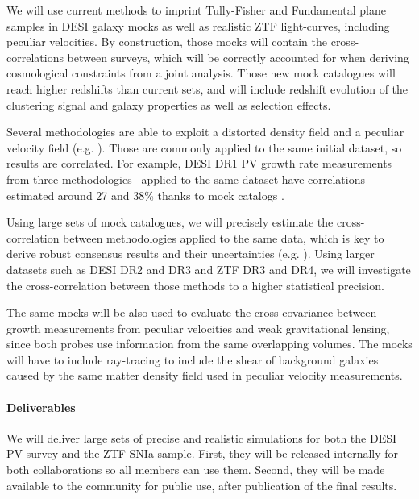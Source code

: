     We will use current methods to imprint Tully-Fisher and Fundamental plane samples in 
    DESI galaxy mocks as well as realistic ZTF light-curves, including peculiar velocities. 
    By construction, those mocks will contain the cross-correlations between surveys, 
    which will be correctly accounted for when deriving cosmological constraints from a 
    joint analysis.     
    Those new mock catalogues will reach higher redshifts than current sets, 
    and will include redshift evolution of the clustering signal and galaxy properties as well as 
    selection effects. 


    Several methodologies are able to exploit a distorted 
    density field and a peculiar velocity field 
    (e.g.  
    \cite{ravouxGeneralizedFrameworkLikelihoodbased2025,
    qinRedshiftspaceMomentumPower2025}). 
    Those are commonly applied to the same initial dataset, 
    so results are correlated. For example, DESI DR1 PV growth rate measurements from three methodologies\
    \cite{qinDESIDR1Peculiar2025,laiDESIDR1Peculiar2025,turnerDESIDR1Peculiar2025} 
    applied to the same dataset have correlations estimated around 27 and 38\% 
    thanks to mock catalogs \cite{bautistaDESIDR1Peculiar2025}.

    Using large sets of mock catalogues, we will 
    precisely estimate the cross-correlation between methodologies applied to the same data, 
    which is key to derive robust consensus results and their uncertainties
    (e.g. \cite{sanchezClusteringGalaxiesCompleted2017,
    bautistaCompletedSDSSIVExtended2021,
    dumerchatBaryonAcousticOscillations2022}).
    Using larger datasets such as DESI DR2 and DR3 and ZTF DR3 and DR4, we will 
    investigate the cross-correlation between those methods to a higher 
    statistical precision. 

    The same mocks will be also used to evaluate the cross-covariance 
    between growth measurements from peculiar velocities and 
    weak gravitational lensing, since both probes use information from 
    the same overlapping volumes. The mocks will have to include ray-tracing 
    to include the shear of background galaxies caused by the same 
    matter density field used in peculiar velocity measurements. 

\paragraph{Deliverables}
    We will deliver large sets of precise and realistic simulations for both 
    the DESI PV survey and the ZTF SNIa sample. First, they will be released 
    internally for both collaborations so all members can use them. 
    Second, they will be made available to the community for public use, after 
    publication of the final results. 

